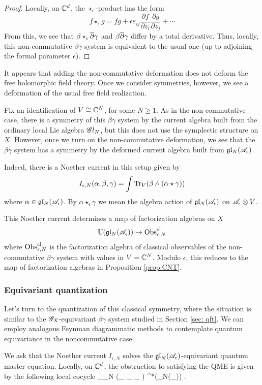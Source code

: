 \begin{proof}
Locally, on $\mathbb C^d$, the $\star_{\epsilon}$-product has the form
\[
f \star_{\epsilon} g = fg + \epsilon \varepsilon_{ij} \frac{\partial f}{\partial z_i} \frac{\partial g}{\partial z_j} + \cdots
\]
From this, we see that $\beta \star_{\epsilon} \overline{\partial} \gamma$ and $\beta \overline{\partial} \gamma$ differ by a total derivative. 
Thus, locally, this non-commutative $\beta\gamma$ system is equivalent to the usual one (up to adjoining the formal parameter $\epsilon$).
\end{proof}

It appears that adding the non-commutative deformation does not deform the free holomorphic field theory. 
Once we consider symmetries, however, we see a deformation of the usual free field realization. 

Fix an identification of $V \cong \mathbb C^N$, for some $N \geq 1$. 
As in the non-commutative case, there is a symmetry of this $\beta\gamma$ system by the current algebra built from the ordinary local Lie algebra $\mathscr G l_N$, but this does not use the symplectic structure on $X$. 
However, once we turn on the non-commutative deformation, we see that the $\beta\gamma$ system has a symmetry by the deformed current algebra built from $\mathfrak{g} \mathfrak{l}_N(\mathscr A_{\epsilon})$. 

Indeed, there is a Noether current in this setup given by
\[
I_{\epsilon,N} (\alpha, \beta,\gamma) = \int {\rm Tr}_{V}(\beta \wedge (\alpha \star \gamma)) 
\]
where $\alpha \in \mathfrak{g} \mathfrak{l}_N(\mathscr A_{\epsilon})$.
By $\alpha \star_\epsilon \gamma$ we mean the algebra action of $\mathfrak{g} \mathfrak{l}_N(\mathscr A_{\epsilon})$ on $\mathscr A_\epsilon \otimes V$. 

\begin{lem}
This Noether current determines a map of factorization algebras on $X$
\[
\mathbb U(\mathfrak{g} \mathfrak{l}_N(\mathscr A_{\epsilon})) \to {\rm Obs}^{{\rm cl}}_{\epsilon, N}
\]
where ${\rm Obs}^{{\rm cl}}_{\epsilon, N}$ is the factorization algebra of classical observables of the non-commutative $\beta\gamma$ system with values in $V = \mathbb C^N$.
Modulo $\epsilon$, this reduces to the map of factorization algebras in Proposition \ref{prop:CNT}.
\end{lem}

\subsubsection{Equivariant quantization}

Let's turn to the quantization of this classical symmetry, where the situation is similar to the $\mathscr G_X$-equivariant $\beta\gamma$ system studied in Section \ref{sec: qft}.
We can employ analogous Feynman diagrammatic methods to contemplate quantum equivariance in the noncommutative case.

We ask that the Noether current $I_{\epsilon,N}$ solves the ${\mathfrak{gl}}_N(\mathscr A_{\epsilon})$-equivariant quantum master equation.
Locally, on $\mathbb C^d$, the obstruction to satisfying the QME is given by the following local cocycle 
\beqn\label{noncommobs}
\int \Tr_{\fgl_N} (\alpha \star_{\epsilon} \partial \alpha \star_{\epsilon} \cdots \star_{\epsilon} \partial \alpha) \in \cloc^*(\fgl_N(\sA_\epsilon)) .
\eeqn



